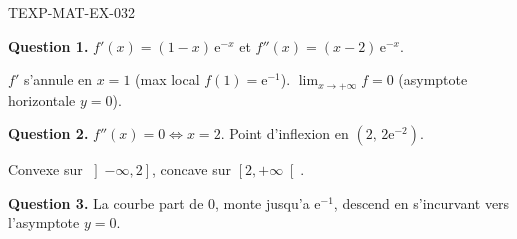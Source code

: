 \begin{corrige}{TEXP-MAT-EX-032}

\textbf{Question 1.} $f'(x) = (1-x)\,\mathrm{e}^{-x}$ et $f''(x) = (x-2)\,\mathrm{e}^{-x}$.


$f'$ s'annule en $x=1$ (max local $f(1)=\mathrm{e}^{-1}$). $\lim_{x\to+\infty} f = 0$ (asymptote horizontale $y=0$).

\textbf{Question 2.} $f''(x) = 0 \iff x = 2$. Point d'inflexion en $(2,\, 2\mathrm{e}^{-2})$.

Convexe sur $\left]-\infty, 2\right]$, concave sur $\left[2, +\infty\right[$.

\textbf{Question 3.} La courbe part de $0$, monte jusqu'a $\mathrm{e}^{-1}$, descend en s'incurvant vers l'asymptote $y=0$.

\end{corrige}
